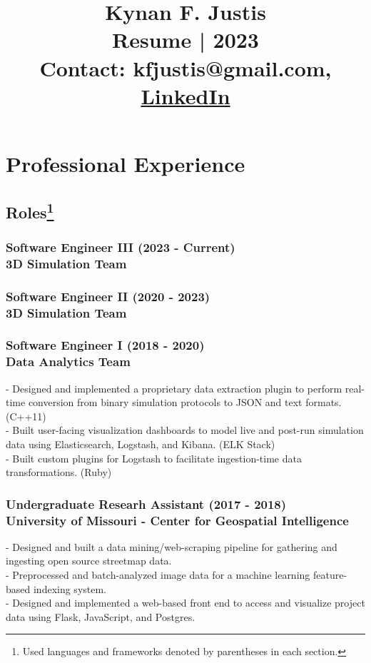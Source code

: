 \documentclass[10pt]{article}
\title{\vspace{-10mm}Kynan F. Justis\vspace{2mm}\\{\normalsize Resume | 2023\vspace{-4mm}\\Contact: kfjustis@gmail.com, {\href{https://www.linkedin.com/in/kynan-justis}{LinkedIn}}}\vspace{-20mm}}
\date{}
\begin{document}
\maketitle

\section*{Professional Experience}
\subsection*{Roles{\footnote[1]{Used languages and frameworks denoted by parentheses in each section.}}}

\subsubsection*{Software Engineer III (2023 - Current)\\3D Simulation Team}

\subsubsection*{Software Engineer II (2020 - 2023)\\3D Simulation Team}

\subsubsection*{Software Engineer I (2018 - 2020)\\Data Analytics Team}
- Designed and implemented a proprietary data extraction plugin to perform real-time conversion from binary simulation protocols to JSON and text formats. (C++11)\\
- Built user-facing visualization dashboards to model live and post-run simulation data using Elasticsearch, Logstash, and Kibana. (ELK Stack)\\
- Built custom plugins for Logstash to facilitate ingestion-time data transformations. (Ruby)

\subsubsection*{Undergraduate Researh Assistant (2017 - 2018)\\University of Missouri - Center for Geospatial Intelligence}
- Designed and built a data mining/web-scraping pipeline for gathering and ingesting open source streetmap data.\\
- Preprocessed and batch-analyzed image data for a machine learning feature-based indexing system.\\
- Designed and implemented a web-based front end to access and visualize project data using Flask, JavaScript, and Postgres.
\end{document}
